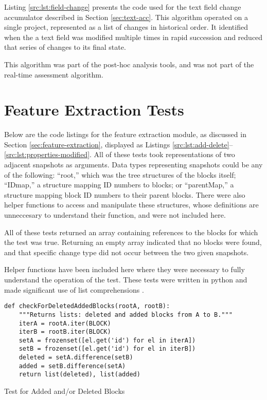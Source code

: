 Listing \ref{src:lst:field-change} presents the code used for the text field change accumulator described in Section \ref{sec:text-acc}. This algorithm operated on a single project, represented as a list of changes in historical order. It identified when the a text field was modified multiple times in rapid succession and reduced that series of changes to its final state.

This algorithm was part of the post-hoc analysis tools, and was not part of the real-time assessment algorithm.


\section{Feature Extraction Tests}
\label{src:feature-extraction-tests}

Below are the code listings for the feature extraction module, as discussed in Section \ref{sec:feature-extraction}, displayed as Listings \ref{src:lst:add-delete}--\ref{src:lst:properties-modified}. All of these tests took representations of two adjacent snapshots as arguments. Data types representing snapshots could be any of the following: ``root,'' which was the tree structures of the blocks itself; ``IDmap,'' a structure mapping ID numbers to blocks; or ``parentMap,'' a structure mapping block ID numbers to their parent blocks. There were also helper functions to access and manipulate these structures, whose definitions are unneccesary to understand their function, and were not included here.

All of these tests returned an array containing references to the blocks for which the test was true. Returning an empty array indicated that no blocks were found, and that specific change type did not occur between the two given snapshots.

Helper functions have been included here where they were necessary to fully understand the operation of the test. These tests were written in python and made significant use of list comprehensions \citep{oliphant2007python}.

\begin{listing}[]
\begin{verbatim}
def checkForDeletedAddedBlocks(rootA, rootB):
    """Returns lists: deleted and added blocks from A to B."""
    iterA = rootA.iter(BLOCK)
    iterB = rootB.iter(BLOCK)
    setA = frozenset([el.get('id') for el in iterA])
    setB = frozenset([el.get('id') for el in iterB])
    deleted = setA.difference(setB)
    added = setB.difference(setA)
    return list(deleted), list(added)
\end{verbatim}
\caption{Test for Added and/or Deleted Blocks}
\label{src:lst:add-delete}
\end{listing}

